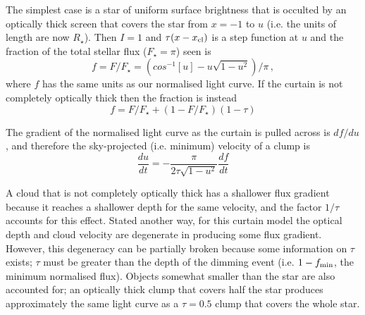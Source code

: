 \documentclass[]{rsos}
\begin{document}

The simplest case is a star of uniform surface brightness that is occulted by an
optically thick screen that covers the star from $x=-1$ to $u$ (i.e. the units of length
are now $R_\star$). Then $I=1$ and $\tau(x-x_{\rm cl})$ is a step function at $u$ and the
fraction of the total stellar flux ($F_\star = \pi$) seen is \cite{2006ApJ...644..510W}
\begin{equation}
  f = F/F_\star = (cos^{-1}[u] - u\sqrt{1-u^2})/\pi \, ,
\end{equation}
where $f$ has the same units as our normalised light curve. If the curtain is not
completely optically thick then the fraction is instead
\begin{equation}
 f = F/F_\star + (1-F/F_\star)(1-\tau)
\end{equation}

The gradient of the normalised light curve as the curtain is pulled across is $df/du$,
and therefore the sky-projected (i.e. minimum) velocity of a clump is
\begin{equation}
  \frac{du}{dt} = -\frac{\pi}{2 \tau \sqrt{1-u^2}}\frac{df}{dt}
\end{equation}

A cloud that is not completely optically thick has a shallower flux gradient because it
reaches a shallower depth for the same velocity, and the factor $1/\tau$ accounts for
this effect. Stated another way, for this curtain model the optical depth and cloud
velocity are degenerate in producing some flux gradient. However, this degeneracy can be
partially broken because some information on $\tau$ exists; $\tau$ must be greater than
the depth of the dimming event (i.e. $1- f_{\rm min}$, the minimum normalised
flux). Objects somewhat smaller than the star are also accounted for; an optically thick
clump that covers half the star produces approximately the same light curve as a
$\tau=0.5$ clump that covers the whole star.
\end{document}
